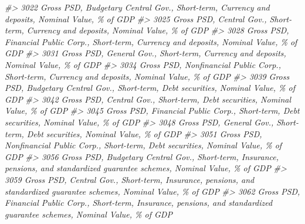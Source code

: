 \documentclass[
]{bxjsbook}
\newenvironment{Shaded}{\begin{snugshade}}{\end{snugshade}}
\newcommand{\CommentTok}[1]{\textcolor[rgb]{0.56,0.35,0.01}{\textit{#1}}}
\theoremstyle{definition}
\theoremstyle{definition}
\theoremstyle{definition}
\theoremstyle{definition}
\theoremstyle{remark}
\begin{document}
\begin{Shaded}
\begin{Highlighting}[]
\CommentTok{\#\textgreater{} 3022                                                                              Gross PSD, Budgetary Central Gov., Short{-}term, Currency and deposits, Nominal Value, \% of GDP}
\CommentTok{\#\textgreater{} 3025                                                                                        Gross PSD, Central Gov., Short{-}term, Currency and deposits, Nominal Value, \% of GDP}
\CommentTok{\#\textgreater{} 3028                                                                              Gross PSD, Financial Public Corp., Short{-}term, Currency and deposits, Nominal Value, \% of GDP}
\CommentTok{\#\textgreater{} 3031                                                                                        Gross PSD, General Gov., Short{-}term, Currency and deposits, Nominal Value, \% of GDP}
\CommentTok{\#\textgreater{} 3034                                                                           Gross PSD, Nonfinancial Public Corp., Short{-}term, Currency and deposits, Nominal Value, \% of GDP}
\CommentTok{\#\textgreater{} 3039                                                                                    Gross PSD, Budgetary Central Gov., Short{-}term, Debt securities, Nominal Value, \% of GDP}
\CommentTok{\#\textgreater{} 3042                                                                                              Gross PSD, Central Gov., Short{-}term, Debt securities, Nominal Value, \% of GDP}
\CommentTok{\#\textgreater{} 3045                                                                                    Gross PSD, Financial Public Corp., Short{-}term, Debt securities, Nominal Value, \% of GDP}
\CommentTok{\#\textgreater{} 3048                                                                                              Gross PSD, General Gov., Short{-}term, Debt securities, Nominal Value, \% of GDP}
\CommentTok{\#\textgreater{} 3051                                                                                 Gross PSD, Nonfinancial Public Corp., Short{-}term, Debt securities, Nominal Value, \% of GDP}
\CommentTok{\#\textgreater{} 3056                                            Gross PSD, Budgetary Central Gov., Short{-}term, Insurance, pensions, and standardized guarantee schemes, Nominal Value, \% of GDP}
\CommentTok{\#\textgreater{} 3059                                                      Gross PSD, Central Gov., Short{-}term, Insurance, pensions, and standardized guarantee schemes, Nominal Value, \% of GDP}
\CommentTok{\#\textgreater{} 3062                                            Gross PSD, Financial Public Corp., Short{-}term, Insurance, pensions, and standardized guarantee schemes, Nominal Value, \% of GDP}

\end{Highlighting}
\end{Shaded}
\end{document}
